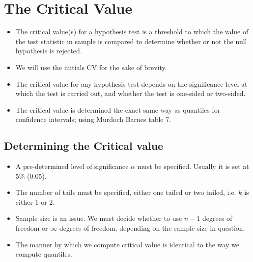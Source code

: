 \documentclass[a4paper,12pt]{article}
\begin{document}
\section*{The Critical Value}

\begin{itemize}
	\item The critical value(s) for a hypothesis test is a threshold to which the value of the test statistic in sample is compared to determine whether or not the null hypothesis is rejected.
		\item We will use the initials CV for the sake of brevity.
	\item The critical value for any hypothesis test depends on the significance level at which the test is carried out, and whether the test is one-sided or two-sided.

	\item The critical value is determined the exact same way as quantiles for confidence intervals; using Murdoch Barnes table 7.
\end{itemize}


\subsection*{Determining the Critical value}
\begin{itemize}
	\item A pre-determined level of significance $\alpha$ must be specified. Usually it is set at 5\% (0.05).
	\item The number of tails must be specified, either one tailed or two tailed, i.e. $k$ is either 1 or 2.
	\item Sample size is an issue. We must decide whether to use $n-1$ degrees of freedom or $\infty$ degrees of freedom, depending on the sample size in question.
	\item The manner by which we compute critical value is identical to the way we compute quantiles. 
\end{itemize}


\end{document}
